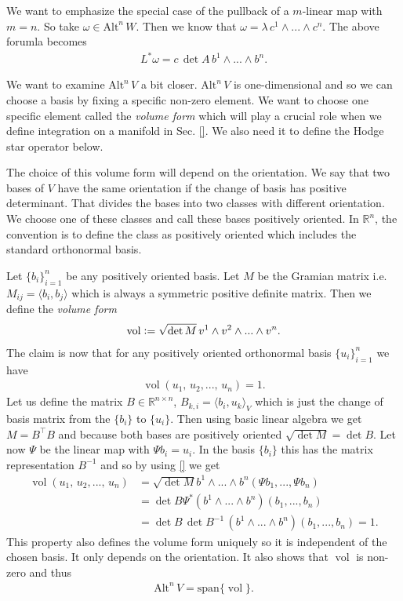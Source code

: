 \documentclass[12pt,a4paper]{article}
\numberwithin{equation}{subsection}
\numberwithin{lemma}{subsection}
\theoremstyle{definition}
\DeclareMathOperator{\vol}{vol}
\newcommand{\alternating}[2]{ {\text{Alt}^{#1}\,#2} }
\newcommand{\real}{\mathbb{R}}
\begin{document}
We want to emphasize the special case of the pullback of a $m$-linear map 
with $m = n$. So take $\omega \in \alternating{n}{W}$. Then we know that 
$\omega = \lambda\, c^1 \wedge ... \wedge c^n$. The above forumla becomes
\begin{align*}
    L^* \omega = c\, \det A \, b^1 \wedge ... \wedge b^n. 
\end{align*}

We want to examine $\alternating{n}{V}$ a bit closer. 
$\alternating{n}{V}$ is one-dimensional and so we can choose a basis by fixing 
a specific non-zero element. We want to choose one specific element 
called the \textit{volume form} which will play a crucial role 
when we define integration on a manifold in Sec. \ref{}. We also need it to 
define the Hodge star operator below.

The choice of this volume form will depend on the orientation. 
We say that two bases of $V$ 
have the same orientation if the change of basis has positive determinant. 
That divides the bases into two classes with different orientation.
We choose one of these classes and call these bases positively
oriented. In $\real^n$, the convention is to define the class as 
positively oriented which includes the standard orthonormal basis.

Let $\{ b_i \}_{i=1}^n$ be any positively oriented
basis. Let $M$ be the Gramian matrix i.e. $M_{ij} = \langle b_i, b_j \rangle$ 
which is always a symmetric positive definite matrix.
Then we define the \textit{volume form}
\begin{align*}
    \vol \vcentcolon= \sqrt{\det M} \, v^1 \wedge v^2 \wedge ... \wedge v^n.
\end{align*}
The claim is now that for any positively oriented 
orthonormal basis $\{u_i\}_{i=1}^n$ we have 
\begin{align*}
    \vol (u_1,\,u_2,...,\,u_n) = 1.
\end{align*}
Let us define the matrix $B \in \real^{n\times n}$, $B_{k,i} = \langle b_i, u_k
\rangle_V$ which is just the change of basis matrix from the $\{ b_i \}$ 
to $\{ u_i \}$. 
Then using basic linear algebra we get
$ M = B^\top B$ and because both bases are positively oriented 
$\sqrt{\det M} = \det B$. Let now $\Psi$ be the linear map with 
$\Psi b_i = u_i$. In the basis $\{ b_i \}$ this has the matrix 
representation $B^{-1}$ and so by using \ref{} we get
\begin{align*}
    \vol (u_1,\,u_2,...,\,u_n) &= \sqrt{ \det M} b^1 \wedge ... \wedge b^n 
    ( \Psi b_1,..., \Psi b_n )
    \\ &= \det B \Psi^* (b^1 \wedge ... \wedge b^n )( b_1,..., b_n) 
    \\ &= \det B \, \det B^{-1} \, (b^1 \wedge ... \wedge b^n )( b_1,..., b_n)
    = 1.
\end{align*}
This property also defines the volume form uniquely so it is independent of the 
chosen basis. It only depends on the orientation.
It also shows that $\vol$ is non-zero and thus 
\begin{align*}
    \alternating{n}{V} = \text{span} \{ \vol \}.
\end{align*}
\end{document}
